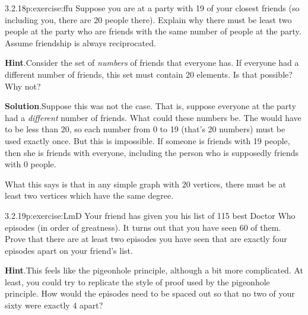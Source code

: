 \documentclass[twoside,11pt,]{book}
\newcommand{\blocktitlefont}{\relax}
\numberwithin{equation}{chapter}
\begin{document}
\begin{divisionsolution}{3.2.18}{}{p:exercise:ffu}%
Suppose you are at a party with 19 of your closest friends (so including you, there are 20 people there). Explain why there must be least two people at the party who are friends with the same number of people at the party. Assume friendship is always reciprocated.%
\par\smallskip%
\noindent\textbf{\blocktitlefont Hint}.\quad{}Consider the set of \emph{numbers} of friends that everyone has.  If everyone had a different number of friends, this set must contain 20 elements.  Is that possible?  Why not?%
\par\smallskip%
\noindent\textbf{\blocktitlefont Solution}.\quad{}Suppose this was not the case. That is, suppose everyone at the party had a \emph{different} number of friends. What could these numbers be. The would have to be less than 20, so each number from 0 to 19 (that's 20 numbers) must be used exactly once. But this is impossible. If someone is friends with 19 people, then she is friends with everyone, including the person who is supposedly friends with 0 people.%
\par
What this says is that in any simple graph with 20 vertices, there must be at least two vertices which have the same degree.%
\end{divisionsolution}%
\begin{divisionsolution}{3.2.19}{}{p:exercise:LmD}%
Your friend has given you his list of 115 best Doctor Who episodes (in order of greatness). It turns out that you have seen 60 of them. Prove that there are at least two episodes you have seen that are exactly four episodes apart on your friend's list.%
\par\smallskip%
\noindent\textbf{\blocktitlefont Hint}.\quad{}This feels like the pigeonhole principle, although a bit more complicated.  At least, you could try to replicate the style of proof used by the pigeonhole principle.  How would the episodes need to be spaced out so that no two of your sixty were exactly 4 apart?%
\end{divisionsolution}%
\end{document}
